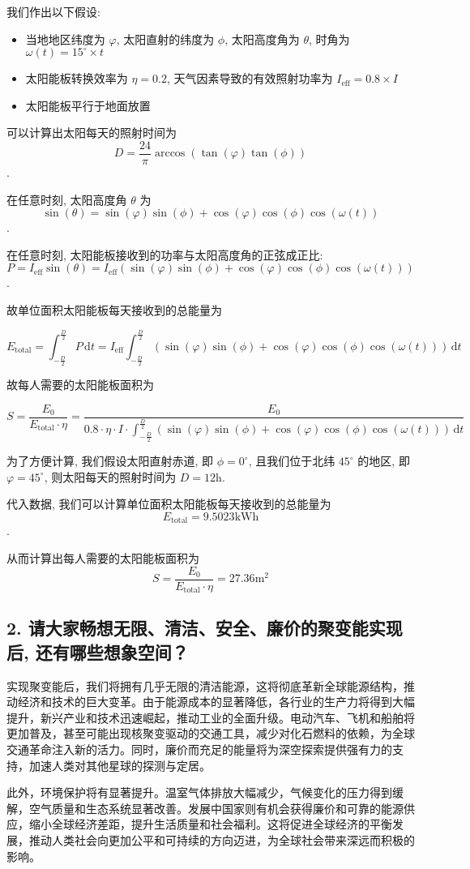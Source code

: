 \documentclass{article}
\begin{document}
我们作出以下假设:
\begin{itemize}
    \item 当地地区纬度为 $\varphi$, 太阳直射的纬度为 $\phi$, 太阳高度角为 $\theta$, 时角为 $\omega(t) = 15^\circ \times t$
    \item 太阳能板转换效率为 $\eta=0.2$, 天气因素导致的有效照射功率为 $I_{\text{eff}} = 0.8 \times I$
    \item 太阳能板平行于地面放置
\end{itemize}

可以计算出太阳每天的照射时间为 $$D = \frac{24}{\pi} \arccos(\tan(\varphi) \tan(\phi))$$.

在任意时刻, 太阳高度角 $\theta$ 为 $$\sin(\theta) = \sin(\varphi) \sin(\phi) + \cos(\varphi) \cos(\phi) \cos(\omega(t))$$.

在任意时刻, 太阳能板接收到的功率与太阳高度角的正弦成正比: $$P = I_{\text{eff}} \sin(\theta) = I_{\text{eff}} (\sin(\varphi) \sin(\phi) + \cos(\varphi) \cos(\phi) \cos(\omega(t)))$$.

故单位面积太阳能板每天接收到的总能量为

$$E_{\text{total}} = \int_{-\frac{D}{2}}^{\frac{D}{2}} P \, \text{d}t = I_{\text{eff}} \int_{-\frac{D}{2}}^{\frac{D}{2}} (\sin(\varphi) \sin(\phi) + \cos(\varphi) \cos(\phi) \cos(\omega(t))) \, \text{d}t$$

故每人需要的太阳能板面积为

$$S = \frac{E_0}{E_{\text{total}} \cdot \eta} = \frac{E_0}{0.8 \cdot \eta \cdot I \cdot \int_{-\frac{D}{2}}^{\frac{D}{2}} (\sin(\varphi) \sin(\phi) + \cos(\varphi) \cos(\phi) \cos(\omega(t))) \, \text{d}t}$$

为了方便计算, 我们假设太阳直射赤道, 即 $\phi = 0^\circ$, 且我们位于北纬 $45^\circ$ 的地区, 即 $\varphi = 45^\circ$, 则太阳每天的照射时间为 $D = 12\text{h}$.

代入数据, 我们可以计算单位面积太阳能板每天接收到的总能量为 $$E_{\text{total}} = 9.5023 \text{kWh}$$.

从而计算出每人需要的太阳能板面积为 $$S = \frac{E_0}{E_{\text{total}} \cdot \eta} = 27.36 \text{m}^2$$

\subsection*{2. 请大家畅想无限、清洁、安全、廉价的聚变能实现后, 还有哪些想象空间？}

实现聚变能后，我们将拥有几乎无限的清洁能源，这将彻底革新全球能源结构，推动经济和技术的巨大变革。由于能源成本的显著降低，各行业的生产力将得到大幅提升，新兴产业和技术迅速崛起，推动工业的全面升级。电动汽车、飞机和船舶将更加普及，甚至可能出现核聚变驱动的交通工具，减少对化石燃料的依赖，为全球交通革命注入新的活力。同时，廉价而充足的能量将为深空探索提供强有力的支持，加速人类对其他星球的探测与定居。

此外，环境保护将有显著提升。温室气体排放大幅减少，气候变化的压力得到缓解，空气质量和生态系统显著改善。发展中国家则有机会获得廉价和可靠的能源供应，缩小全球经济差距，提升生活质量和社会福利。这将促进全球经济的平衡发展，推动人类社会向更加公平和可持续的方向迈进，为全球社会带来深远而积极的影响。
\end{document}
